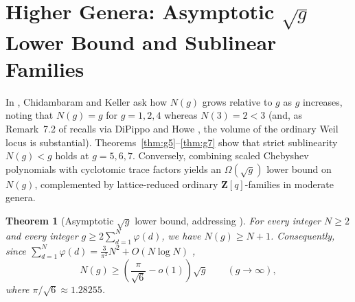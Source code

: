 \documentclass[11pt]{amsart}
\newtheorem{theorem}{Theorem}[section]
\theoremstyle{remark}
\newcommand{\Z}{\mathbf{Z}}
\begin{document}
\section{Higher Genera: Asymptotic \texorpdfstring{$\sqrt{g}$}{sqrt(g)} Lower Bound and Sublinear Families}\label{sec:chebyshev}

In \cite[Question~7.9]{CK26}, Chidambaram and Keller ask how $N(g)$ grows relative to $g$ as $g$ increases, noting that $N(g) = g$ for $g = 1, 2, 4$ whereas $N(3) = 2 < 3$ (and, as Remark~7.2 of \cite{CK26} recalls via DiPippo and Howe \cite[Theorem~1.1]{DH98}, the volume of the ordinary Weil locus is substantial). Theorems~\ref{thm:g5}--\ref{thm:g7} show that strict sublinearity $N(g) < g$ holds at $g = 5, 6, 7$. Conversely, combining scaled Chebyshev polynomials with cyclotomic trace factors yields an $\Omega(\sqrt{g})$ lower bound on $N(g)$, complemented by lattice-reduced ordinary $\Z[q]$-families in moderate genera.

\begin{theorem}[Asymptotic $\sqrt{g}$ lower bound, addressing {\cite[Question~7.9]{CK26}}]\label{thm:sqrt-g}
For every integer $N \ge 2$ and every integer $g \ge 2 \sum_{d=1}^N \varphi(d)$, we have $N(g) \ge N + 1$. Consequently, since $\sum_{d=1}^N \varphi(d) = \frac{3}{\pi^2} N^2 + O(N \log N)$ \cite[Theorem~330]{HW08},
\[
N(g) \ge \left(\frac{\pi}{\sqrt{6}} - o(1)\right)\sqrt{g} \qquad (g \to \infty),
\]
where $\pi/\sqrt{6} \approx 1.28255$.
\end{theorem}
\end{document}
